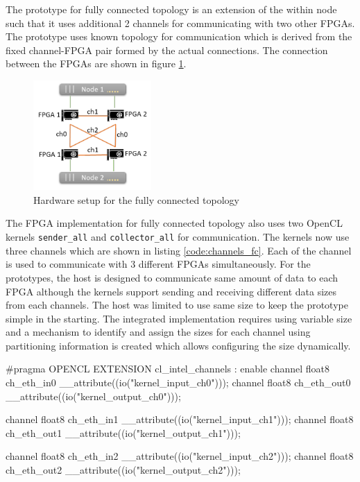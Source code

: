 The prototype for fully connected topology is an extension of the within node such that
it uses additional 2 channels for communicating with two other FPGAs. The prototype uses known
topology for communication which is derived from the fixed channel-FPGA pair formed by the
actual connections. The connection between the FPGAs are shown in figure \ref{fig:fc_topology}.

\begin{figure}[h]%
    \centering
    \includegraphics[width=0.4\textwidth]{images/fc_topology}
    \caption{Hardware setup for the fully connected topology}
    \label{fig:fc_topology}
\end{figure}

The FPGA implementation for fully connected topology also uses two OpenCL kernels
\texttt{sender\_all} and \texttt{collector\_all} for communication. The kernels
now use three channels which are shown in listing \ref{code:channels_fc}.
Each of the channel is used to communicate with 3 different FPGAs simultaneously.
For the prototypes, the host is designed to communicate same amount of data
to each FPGA although the kernels support sending and receiving different data
sizes from each channels. The host was limited to use same size to keep the prototype
simple in the starting. The integrated implementation requires using variable size and
a mechanism to identify and assign the sizes for each channel using partitioning
information is created which allows configuring the size dynamically.

\begin{CppCode} [caption=Channels used for fully connected topology, frame=tlrb, label=code:channels_fc]
#pragma OPENCL EXTENSION cl_intel_channels : enable
channel float8 ch_eth_in0 __attribute((io("kernel_input_ch0")));
channel float8 ch_eth_out0 __attribute((io("kernel_output_ch0")));

channel float8 ch_eth_in1 __attribute((io("kernel_input_ch1")));
channel float8 ch_eth_out1 __attribute((io("kernel_output_ch1")));

channel float8 ch_eth_in2 __attribute((io("kernel_input_ch2")));
channel float8 ch_eth_out2 __attribute((io("kernel_output_ch2")));
\end{CppCode}


